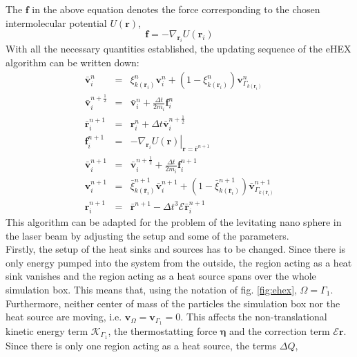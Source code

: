 \documentclass[12pt]{article}
\begin{document}
The $\mathbf{f}$ in the above equation denotes the force corresponding to the chosen intermolecular potential $U(\mathbf{r})$, 
\begin{equation}
    \mathbf{f} = -\nabla_{\mathbf{r}_i} U(\mathbf{r}_i)
\end{equation}
With all the necessary quantities established, the updating sequence of the eHEX algorithm can be written down:
\begin{subequations}
\begin{eqnarray}
    \bar{\mathbf{v}}^n_i &=& \xi^n_{k(\mathbf{r}_i)} \mathbf{v}^n_i + \left(1-\xi^n_{k(\mathbf{r}_i)}\right) \mathbf{v}^n_{\Gamma_{k(\mathbf{r}_i)}} \\
    \bar{\mathbf{v}}^{n+\frac12}_i &=& \bar{\mathbf{v}}^n_i + \frac{\Delta t}{2m_i} \mathbf{f}^n_i\\
    \bar{\mathbf{r}}^{n+1}_i &=& \mathbf{r}^n_i + \Delta t \bar{\mathbf{v}}^{n+\frac12}_i\\
    \mathbf{f}^{n+1}_i &=& \left.-\nabla_{\mathbf{r}_i} U(\mathbf{r})\right|_{\mathbf{r} = \bar{\mathbf{r}}^{n+1}}\\
    \bar{\mathbf{v}}^{n+1}_i &=& \bar{\mathbf{v}}^{n+\frac12}_i + \frac{\Delta t}{2m_i} \mathbf{f}^{n+1}_i\\
    \mathbf{v}^{n+1}_i &=& \bar{\xi}^{n+1}_{k(\bar{\mathbf{r}}_i)} \bar{\mathbf{v}}^{n+1}_i + \left(1-\bar{\xi}^{n+1}_{k(\bar{\mathbf{r}}_i)}\right)
    \bar{\mathbf{v}}^{n+1}_{\Gamma_{k(\bar{\mathbf{r}}_i)}} \\
    \mathbf{r}^{n+1}_i &=& \bar{\mathbf{r}}^{n+1} - \Delta t^3 \mathcal{E}\bar{\mathbf{r}}^{n+1}_i
\end{eqnarray}
\end{subequations}
This algorithm can be adapted for the problem of the levitating nano sphere in the laser beam by adjusting the setup and some of the parameters.\\
Firstly, the setup of the heat sinks and sources has to be changed. Since there is only energy pumped into the system from the outside, the region
acting as a heat sink vanishes and the region acting as a heat source spans over the whole simulation box. This means that, using the 
notation of fig. \ref{fig:ehex}, $\Omega = \Gamma_1$. Furthermore, neither center of mass of the particles the simulation box nor 
the heat source are moving, i.e. 
$\mathbf{v}_\Omega = \mathbf{v}_{\Gamma_1} = 0$. This affects the non-translational kinetic energy term $\mathcal{K}_{\Gamma_1}$, the thermostatting
force $\boldsymbol{\eta}$ and the correction term $\mathcal{E}\mathbf{r}$. Since there is only one region acting as a heat source, the terms $\Delta Q$,
\end{document}
